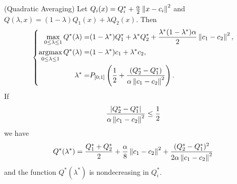 \documentclass[12pt,english]{article}
\begin{document}
\begin{lemma}(Quadratic Averaging)\label{lemma:quadav}
Let $Q_i(x) = Q_i^* + \frac{\alpha}{2}\left\|x-c_i\right\|^2$ and $Q(\lambda, x) = (1-\lambda)Q_1(x)+\lambda Q_2(x)$. Then
%
\begin{equation}\label{eq:qa_sol}
%
\left\{
\begin{aligned}
\max_{0\le\lambda\le1} Q^*(\lambda) =& (1-\lambda^*)Q_1^*+\lambda^* Q_2^* + \frac{\lambda^*(1-\lambda^*)\alpha}{2}\norm{c_1-c_2}^2,\\ 
\argmax_{0\le\lambda\le1} Q^*(\lambda) =& (1-\lambda^*)c_1+\lambda^* c_2,\\
\lambda^* =& P_{[0;1]}\left(\frac12 + \frac{(Q_2^*-Q_1^*)}{\alpha\norm{c_1-c_2}^2}\right).
\end{aligned}
\right.
%
\end{equation}
%
If 
%
\begin{equation}\label{eq:qa_cond}
\frac{\left\vert{Q_2^*-Q_1^*}\right\vert}{\alpha\left\|c_1-c_2\right\|^2}\le \frac12
\end{equation}
%
we have
%
\begin{equation}\label{eq:qa_sol}
Q^*(\lambda^*) =\frac{Q_1^*+Q_2^*}{2}+ \frac{\alpha}{8}\left\|c_1-c_2\right\|^2+\frac{(Q_2^*-Q_1^*)^2}{2\alpha\left\|c_1-c_2\right\|^2}
\end{equation}
%
and the function $Q^*(\lambda^*)$ is nondecreasing in $Q_i^*$.
\end{lemma}
%
\end{document}
